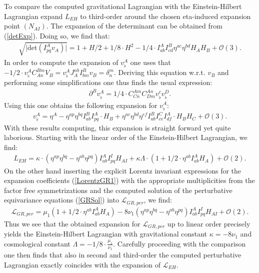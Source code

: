 \documentclass[a4paper,12pt, DIV=14, BCOR=5mm, twoside, headsepline, numbers=noenddot]{scrbook}
\begin{document}
To compare the computed gravitational Lagrangian with the Einstein-Hilbert Lagrangian expand $L_{EH}$ to third-order around the chosen eta-induced expansion point $(N_{AI})$. The expansion of the determinant can be obtained from (\ref{detExp}). Doing so, we find that:
\begin{align}
   \sqrt{\vert \mathrm{det} \left ( I^A_{pq}v_A \right ) \vert } = 1 + H/2 +1/8 \cdot H^2 - 1/4 \cdot I^A_{ab}I^B_{cd} \eta^{ac} \eta^{bd} H_A H_B + \mathcal{O}(3).   
\end{align}
In order to compute the expansion of $v^A_{\flat}$ one uses that $-1/2 \cdot v_{\flat}^AC_{An}^{Bm}V_B = v_{\flat}^A J_A^{nb}I^B_{bm}v_B = \delta^m_n$. Deriving this equation w.r.t. $v_B$ and performing some simplifications one thus finds the usual expression:
\begin{align}
    \partial^Bv_{\flat}^A = 1/4 \cdot C_{Cn}^{Am}C_{Dm}^{An}v_{\flat}^c v_{\flat}^{D}.
\end{align}
Using this one obtains the following expansion for $v_{\flat}^A$:
\begin{align}
    v_{\flat}^A = \eta^A - \eta^{ap}\eta^{bq} I^B_{ab} I^A_{pq} \cdot H_B + \eta^{ac}\eta^{bd}\eta^{ef} I^B_{ab} I^C_{ce} I^A_{df} \cdot H_BH_C + \mathcal{O}(3).  
\end{align}
With these results computing, this expansion is straight forward yet quite laborious.
Starting with the linear order of the Einstein-Hilbert Lagrangian, we find:
\begin{align}
        L_{EH} = \kappa \cdot (\eta^{ap}\eta^{bq} - \eta^{ab}\eta^{pq}) I^{A}_{ab}I^{I}_{pq} H_{AI} + \kappa \Lambda \cdot (1 + 1/2 \cdot \eta^{ab} I_{ab}^A H_A) + \mathcal{O}(2).
\end{align}
On the other hand inserting the explicit Lorentz invariant expressions for the expansion coefficients (\ref{LorentzGR1}) with the appropriate multiplicities from the factor free symmetrizations and the computed solution of the perturbative equivariance equations (\ref{GRSol}) into $\mathcal{L}_{GR,per}$, we find:
\begin{align}
    \mathcal{L}_{GR,per} = \mu_1(1 + 1/2 \cdot \eta^{ab} I_{ab}^A H_A) - 8 \nu_1 \left(\eta^{ap}\eta^{bq} - \eta^{ab}\eta^{pq} \right )I^{A}_{ab}I^{I}_{pq} H_{AI} + \mathcal{O}(2).
\end{align}
Thus we see that the obtained expansion for $\mathcal{L}_{GR,per}$ up to linear order precisely yields the Einstein-Hilbert Lagrangian with gravitational constant $\kappa = -8 \nu_1$ and cosmological constant $\Lambda = -1/8 \cdot \frac{\mu_1}{\nu_1}$. Carefully proceeding with the comparison one then finds that also in second and third-order the computed perturbative Lagrangian exactly coincides with the expansion of $\mathcal{L}_{EH}$.  
\end{document}
